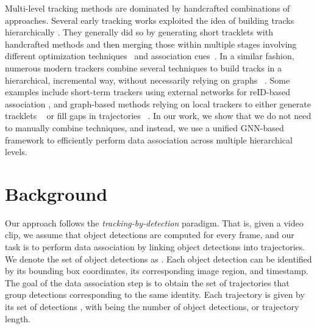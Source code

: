 \documentclass[10pt,twocolumn,letterpaper]{article}
\begin{document}
{{ Multi-level tracking methods are dominated by handcrafted combinations of approaches. Several early tracking works exploited the idea of building tracks hierarchically  \cite{hierarchical_first, multi_view_hierarchical, hierarchical_hypergraph, net_flows_stitching}. They generally did so by generating short tracklets with handcrafted methods and then merging those within multiple stages involving different optimization techniques~\cite{hierarchical_hypergraph,multi_view_hierarchical,net_flows_stitching} and association cues~\cite{hierarchical_first}.  In a similar fashion, numerous modern trackers combine several techniques to build tracks in a hierarchical, incremental way, without necessarily relying on graphs ~\cite{tracktor, trackformer, mpntrack, lpc, lift, aplift, associating_clips}. Some examples include short-term trackers using external networks for reID-based association \cite{deepsort, tracktor, trackformer}, and graph-based methods relying on local trackers to either generate tracklets ~\cite{mpntrack} or fill gaps in trajectories ~\cite{aplift, lift}. In our work, we show that we do not need to manually combine techniques, and instead, we use a unified GNN-based framework to efficiently perform data association across multiple hierarchical levels. 



 


\section{Background} \label{background}
 Our approach follows the \textit{tracking-by-detection} paradigm. That is, given a video clip, we assume that object detections are computed for every frame, and our task is to perform data association by linking object detections into trajectories.
We denote the set of object detections as . Each object detection  can be identified by its bounding box coordinates, its corresponding image region, and timestamp. The goal of the data association step is to obtain the set of trajectories  that group detections corresponding to the same identity. Each trajectory  is given by its set of detections , with  being the number of object detections, or trajectory length. 

}}
\end{document}
